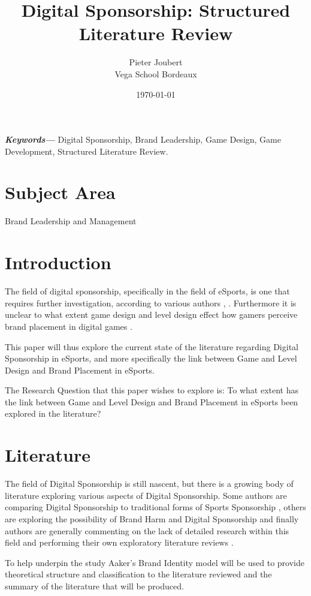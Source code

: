 \documentclass[10pt,twoside]{article}
\title{Digital Sponsorship: Structured Literature Review}
\author{Pieter Joubert \\
	Vega School Bordeaux \\
	}
\date{\today}
\providecommand{\keywords}[1]
{
  \small	
  \textbf{\textit{Keywords---}} #1
}
\begin{document}
\maketitle
\keywords{Digital Sponsorship, Brand Leadership, Game Design, Game Development, Structured Literature Review.}

\section{Subject Area}
Brand Leadership and Management
\section{Introduction}

The field of digital sponsorship, specifically in the field of eSports, is one that requires further investigation, according to various authors \cite{huettermann2020esports}, \cite{Elasri-Ejjaberi2020}. Furthermore it is unclear to what extent game design and level design effect how gamers perceive brand placement in digital games \cite{hwang2017effects}.

This paper will thus explore the current state of the literature regarding Digital Sponsorship in eSports, and more specifically the link between Game and Level Design and Brand Placement in eSports.

The Research Question that this paper wishes to explore is: To what extent has the link between Game and Level Design and Brand Placement in eSports been explored in the literature?

\section{Literature}
The field of Digital Sponsorship is still nascent, but there is a growing body of literature exploring various aspects of Digital Sponsorship. Some authors are comparing Digital Sponsorship to traditional forms of Sports Sponsorship \cite{huettermann2020esports}, others are exploring the possibility of Brand Harm and Digital Sponsorship \cite{Freitas2019} and finally authors are generally commenting on the lack of detailed research within this field and performing their own exploratory literature reviews \cite{Elasri-Ejjaberi2020}.

To help underpin the study Aaker's Brand Identity model will be used to provide theoretical structure and classification to the literature reviewed and the summary of the literature that will be produced. \cite{aaker2012brand}
\end{document}
